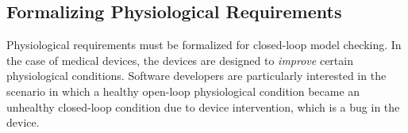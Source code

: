 \subsection{Formalizing Physiological Requirements}
%
%
Physiological requirements must be formalized for closed-loop model checking. In the case of medical devices, the devices are designed to \emph{improve} certain physiological conditions. 
Software developers are particularly interested in the scenario in which a healthy open-loop physiological condition became an unhealthy closed-loop condition due to device intervention, which is a bug in the device.

